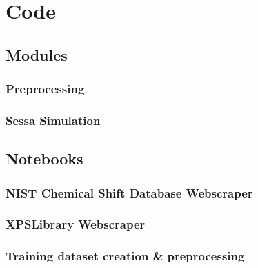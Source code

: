 

\chapter{Code} %

\label{AppendixA} %

\section{Modules}

\subsection{Preprocessing}
\label{preprocessing}


\subsection{Sessa Simulation}
\label{Sessa_Module}


\section{Notebooks}

\subsection{NIST Chemical Shift Database Webscraper}
\label{NIST_WebScraper}


\subsection{XPSLibrary Webscraper}
\label{xpslibrary_webscraper}



\subsection{Training dataset creation \& preprocessing}
\label{train_data_generation}


